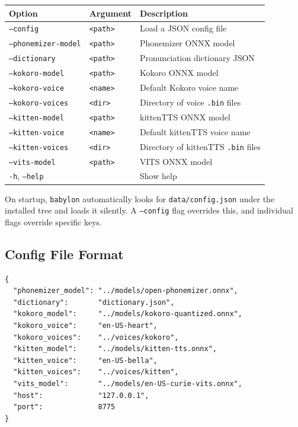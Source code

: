 \documentclass[12pt,a4paper]{article}
\begin{document}
\begin{center}
\begin{tabular}{lll}
\toprule
\textbf{Option} & \textbf{Argument} & \textbf{Description} \\
\midrule
\texttt{--config}           & \texttt{<path>} & Load a JSON config file \\
\texttt{--phonemizer-model} & \texttt{<path>} & Phonemizer ONNX model \\
\texttt{--dictionary}       & \texttt{<path>} & Pronunciation dictionary JSON \\
\texttt{--kokoro-model}     & \texttt{<path>} & Kokoro ONNX model \\
\texttt{--kokoro-voice}     & \texttt{<name>} & Default Kokoro voice name \\
\texttt{--kokoro-voices}    & \texttt{<dir>}  & Directory of voice \texttt{.bin} files \\
\texttt{--kitten-model}     & \texttt{<path>} & kittenTTS ONNX model \\
\texttt{--kitten-voice}     & \texttt{<name>} & Default kittenTTS voice name \\
\texttt{--kitten-voices}    & \texttt{<dir>}  & Directory of kittenTTS \texttt{.bin} files \\
\texttt{--vits-model}       & \texttt{<path>} & VITS ONNX model \\
\texttt{-h}, \texttt{--help} &                & Show help \\
\bottomrule
\end{tabular}
\end{center}

On startup, \texttt{babylon} automatically looks for \texttt{data/config.json} under the installed tree and loads it silently. A \texttt{--config} flag overrides this, and individual flags override specific keys.

\newpage

\subsection{Config File Format}

\begin{lstlisting}[language={}]
{
  "phonemizer_model": "../models/open-phonemizer.onnx",
  "dictionary":       "dictionary.json",
  "kokoro_model":     "../models/kokoro-quantized.onnx",
  "kokoro_voice":     "en-US-heart",
  "kokoro_voices":    "../voices/kokoro",
  "kitten_model":     "../models/kitten-tts.onnx",
  "kitten_voice":     "en-US-bella",
  "kitten_voices":    "../voices/kitten",
  "vits_model":       "../models/en-US-curie-vits.onnx",
  "host":             "127.0.0.1",
  "port":             8775
}
\end{lstlisting}
\end{document}
